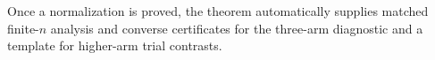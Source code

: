 Once a normalization is proved, the theorem automatically supplies matched finite-\(n\) analysis and converse certificates for the three-arm diagnostic and a template for higher-arm trial contrasts.